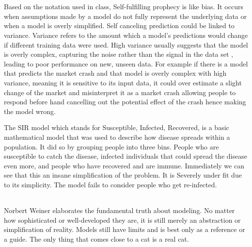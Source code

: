 \documentclass[12pt]{article}
\begin{document}
\begin{enumerate}
 \\ \\
Based on the notation used in class, Self-fulfilling prophecy is like bias. It occurs when assumptions made by a model do not fully represent the underlying data or when a model is overly simplified. Self canceling prediction could be linked to variance. Variance refers to the amount which a model's predictions would change if different training data were used. High variance usually suggests that the model is overly complex, capturing the noise rather than the signal in the data set ,  leading to poor performance on new, unseen data. For example if there is a model that predicts the market crash and that model is overly complex with high variance, meaning it is sensitive to its input data, it could over estimate a slight change of the market and misinterpret it as a market crash allowing people to respond before hand cancelling out the potential effect of the crash hence making the model wrong. 


The SIR model which stands for Susceptible, Infected, Recovered, is a basic mathematical model that was used to describe how disease spreads within a population. It did so by grouping people into three bins. People who are susceptible to catch the disease, infected individuals that could spread the disease even more, and people who have recovered and are immune. Immediately we can see that this an insane simplification of the problem. It is Severely under fit due to its simplicity. The model fails to consider people who get re-infected.

 \\
Norbert Weiner elaborates the fundamental truth about modeling. No matter how sophisticated or well-developed they are, it is still merely an abstraction or simplification of reality. Models still have limits and is best only as a reference or a guide. The only thing that comes close to a cat is a real cat. 

\end{enumerate}
\end{document}
